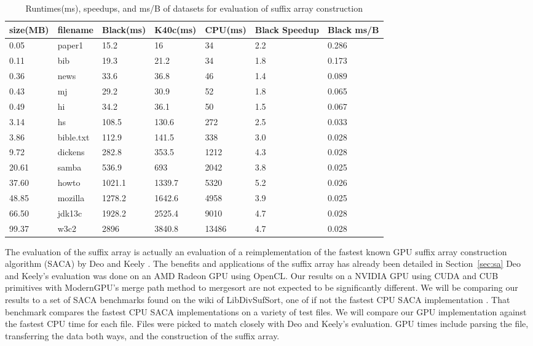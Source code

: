 \begin{table}[h]
\begin{tabular}{@{}lllllll@{}}
\toprule
size(MB) & filename  & Black(ms)  & K40c(ms)   & CPU(ms)   & Black Speedup & Black ms/B \\ \midrule
0.05     & paper1    & 15.2   & 16     & 34    & 2.2           & 0.286          \\
0.11     & bib       & 19.3   & 21.2   & 34    & 1.8           & 0.173          \\
0.36     & news      & 33.6   & 36.8   & 46    & 1.4           & 0.089          \\
0.43     & mj        & 29.2   & 30.9   & 52    & 1.8           & 0.065          \\
0.49     & hi        & 34.2   & 36.1   & 50    & 1.5           & 0.067          \\
3.14     & hs        & 108.5  & 130.6  & 272   & 2.5           & 0.033          \\
3.86     & bible.txt & 112.9  & 141.5  & 338   & 3.0           & 0.028          \\
9.72     & dickens   & 282.8  & 353.5  & 1212  & 4.3           & 0.028          \\
20.61    & samba     & 536.9  & 693    & 2042  & 3.8           & 0.025          \\
37.60    & howto     & 1021.1 & 1339.7 & 5320  & 5.2           & 0.026          \\
48.85    & mozilla   & 1278.2 & 1642.6 & 4958  & 3.9           & 0.025          \\
66.50    & jdk13c    & 1928.2 & 2525.4 & 9010  & 4.7           & 0.028          \\
99.37    & w3c2      & 2896   & 3840.8 & 13486 & 4.7           & 0.028          \\ \bottomrule
\end{tabular}
\caption{Runtimes(ms), speedups, and ms/B of datasets for evaluation of suffix array construction}
\label{tab:sadata}
\end{table}

The evaluation of the suffix array is actually an evaluation of a reimplementation of the fastest known GPU suffix array construction algorithm (SACA) by Deo and Keely \cite{Deo}.
The benefits and applications of the suffix array has already been detailed in Section~\ref{sec:sa} 
Deo and Keely's evaluation was done on an AMD Radeon GPU using OpenCL.
Our results on a NVIDIA GPU using CUDA and CUB primitives with ModernGPU's merge path method to mergesort are not expected to be significantly different.
We will be comparing our results to a set of SACA benchmarks found on the wiki of LibDivSufSort, one of if not the fastest CPU SACA implementation \cite{SACA}.
That benchmark compares the fastest CPU SACA implementations on a variety of test files.
We will compare our GPU implementation against the fastest CPU time for each file.
Files were picked to match closely with Deo and Keely's evaluation.
GPU times include parsing the file, transferring the data both ways, and the construction of the suffix array.

